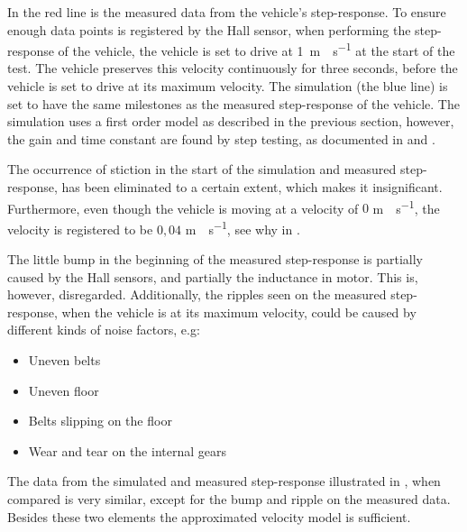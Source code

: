 %
In  the red line is the measured data from the vehicle's step-response. To ensure enough data points is registered by the Hall sensor, when performing the step-response of the vehicle, the vehicle is set to drive at \si{1 m\cdot s^{-1}} at the start of the test. The vehicle preserves this velocity continuously for three seconds, before the vehicle is set to drive at its maximum velocity. The simulation (the blue line) is set to have the same milestones as the measured step-response of the vehicle.
The simulation uses a first order model as described in the previous section, however, the gain and time constant are found by step testing, as documented in  and .

The occurrence of stiction in the start of the simulation and measured step-response, has been eliminated to a certain extent, which makes it insignificant. Furthermore, even though the vehicle is moving at a velocity of $0$ \si{m \cdot s^{-1}}, the velocity is registered to be $0,04$ \si{m \cdot s^{-1}}, see why in . 

The little bump in the beginning of the measured step-response is partially caused by the Hall sensors, and partially the inductance in motor. This is, however, disregarded. Additionally, the ripples seen on the measured step-response, when the vehicle is at its maximum velocity, could be caused by different kinds of noise factors, e.g:

\begin{itemize}
\item Uneven belts
\item Uneven floor
\item Belts slipping on the floor
\item Wear and tear on the internal gears
\end{itemize}

The data from the simulated and measured step-response illustrated in , when compared is very similar, except for the bump and ripple on the measured data. Besides these two elements the approximated velocity model is sufficient.